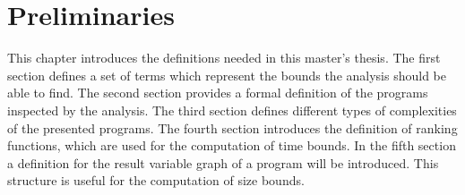 \section{Preliminaries}

This chapter introduces the definitions needed in this master's thesis.
The first section defines a set of terms which represent the bounds the analysis should be able to find. 
The second section provides a formal definition of the programs inspected by the analysis.
The third section defines different types of complexities of the presented programs. 
The fourth section introduces the definition of ranking functions, which are used for the computation of time bounds.
In the fifth section a definition for the result variable graph of a program will be introduced.
This structure is useful for the computation of size bounds.








